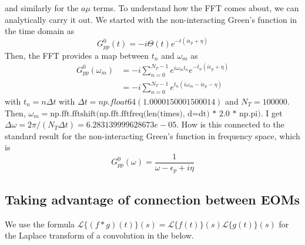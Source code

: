 and similarly for the $a\mu$ terms.
To understand how the FFT comes about, we can analytically carry it out. We started with the non-interacting Green's function in the time domain as
\begin{equation}
    G^0_{pp}(t) = -i \Theta(t) e^{-t(i \epsilon_p + \eta)}
\end{equation}
Then, the FFT provides a map between $t_n$ and $\omega_m$ as
\begin{align}
G^0_{pp}(\omega_m) &= -i \sum_{n=0}^{N_T - 1} e^{i \omega_m t_n} e^{-t_n (i \epsilon_p + \eta)} \\
&= -i \sum_{n=0}^{N_T - 1} e^{t_n (i \omega_m - i \epsilon_p - \eta)}
\end{align}
with $t_n = n \Delta t$ with $\Delta t = np.float64(1.0000150001500014)$ and $N_T = 100000$. Then, $\omega_m = \text{np.fft.fftshift(np.fft.fftfreq(len(times), d=dt) * 2.0 * np.pi)}$. I get $\Delta \omega = 2 \pi / (N_T \Delta t) = 6.283139999628673e-05$. 
How is this connected to the standard result for the non-interacting Green's function in frequency space, which is
\begin{equation}
    G^0_{pp}(\omega) = \frac{1}{\omega - \epsilon_p + i \eta}
\end{equation}

\subsection{Taking advantage of connection between EOMs}

We use the formula $\mathcal{L}\{(f*g)(t)\}(s)=\mathcal{L}\{f(t)\}(s) \mathcal{L}\{g(t)\}(s)$ for the Laplace transform of a convolution in the below.
